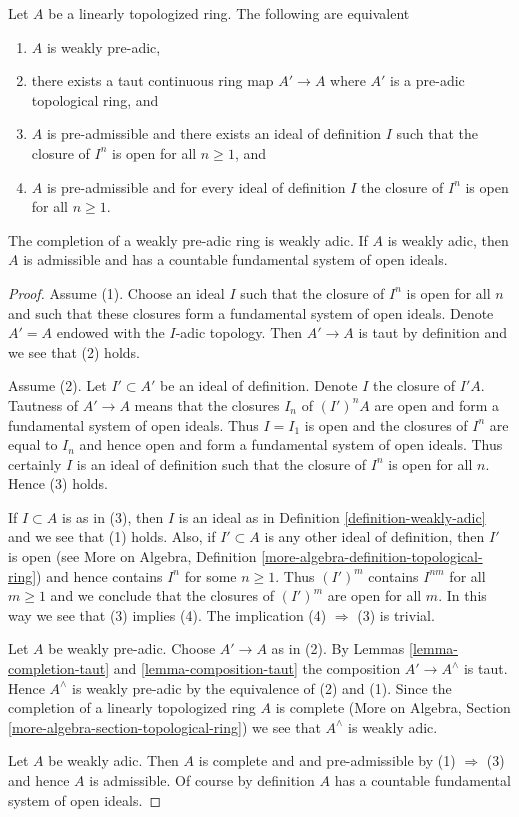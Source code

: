 \begin{lemma}
\label{lemma-weakly-adic}
Let $A$ be a linearly topologized ring. The following are equivalent
\begin{enumerate}
\item $A$ is weakly pre-adic,
\item there exists a taut continuous ring map $A' \to A$
where $A'$ is a pre-adic topological ring, and
\item $A$ is pre-admissible and there exists an ideal of definition $I$
such that the closure of $I^n$ is open for all $n \geq 1$, and
\item $A$ is pre-admissible and for every ideal of definition $I$
the closure of $I^n$ is open for all $n \geq 1$.
\end{enumerate}
The completion of a weakly pre-adic ring is weakly adic.
If $A$ is weakly adic, then $A$ is admissible and has a countable
fundamental system of open ideals.
\end{lemma}

\begin{proof}
Assume (1). Choose an ideal $I$ such that the closure
of $I^n$ is open for all $n$ and such that these closures form
a fundamental system of open ideals. Denote $A' = A$ endowed with
the $I$-adic topology. Then $A' \to A$ is taut by definition and
we see that (2) holds.

\medskip\noindent
Assume (2). Let $I' \subset A'$ be an ideal of definition.
Denote $I$ the closure of $I'A$. Tautness of $A' \to A$ means
that the closures $I_n$ of $(I')^nA$ are open and form a fundamental system of
open ideals. Thus $I = I_1$ is open and the closures of $I^n$
are equal to $I_n$ and hence open and form a fundamental system of
open ideals. Thus certainly $I$ is an ideal of definition
such that the closure of $I^n$ is open for all $n$. Hence (3) holds.

\medskip\noindent
If $I \subset A$ is as in (3), then $I$ is an ideal as in
Definition \ref{definition-weakly-adic} and we see that (1) holds.
Also, if $I' \subset A$ is any other ideal of definition, then
$I'$ is open (see More on Algebra, Definition
\ref{more-algebra-definition-topological-ring})
and hence contains $I^n$ for some $n \geq 1$.
Thus $(I')^m$ contains $I^{nm}$ for all $m \geq 1$ and we
conclude that the closures of $(I')^m$ are open for all $m$.
In this way we see that (3) implies (4).
The implication (4) $\Rightarrow$ (3) is trivial.

\medskip\noindent
Let $A$ be weakly pre-adic. Choose $A' \to A$ as in (2).
By Lemmas \ref{lemma-completion-taut} and
\ref{lemma-composition-taut}
the composition $A' \to A^\wedge$ is taut. Hence $A^\wedge$
is weakly pre-adic by the equivalence of (2) and (1).
Since the completion of a linearly topologized ring $A$ is complete
(More on Algebra, Section \ref{more-algebra-section-topological-ring})
we see that $A^\wedge$ is weakly adic.

\medskip\noindent
Let $A$ be weakly adic. Then $A$ is complete and
and pre-admissible by (1) $\Rightarrow$ (3) and hence $A$
is admissible. Of course by definition $A$ has a countable
fundamental system of open ideals.
\end{proof}

